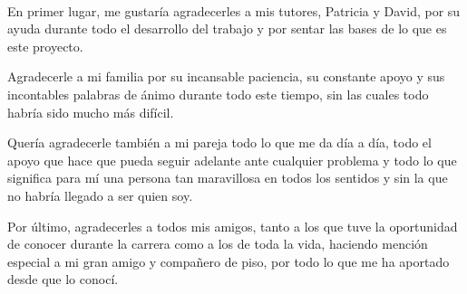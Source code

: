 \documentclass[11pt,a4paper,titlepage,oneside]{report}
\begin{document}
\setlength\arrayrulewidth{0.7pt}



\paxinaenbranco\
\begin{agradecementos}
  En primer lugar, me gustaría agradecerles a mis tutores, Patricia y David, por su ayuda durante todo el desarrollo del trabajo y por sentar
  las bases de lo que es este proyecto.

  Agradecerle a mi familia por su incansable paciencia, su constante apoyo y sus incontables
  palabras de ánimo durante todo este tiempo, sin las cuales todo habría sido mucho más difícil.

  Quería agradecerle también a mi pareja todo lo que me da día a día, todo el apoyo que hace que pueda
  seguir adelante ante cualquier problema y todo lo que significa para mí una persona tan maravillosa
  en todos los sentidos y sin la que no habría llegado a ser quien soy.

  Por último, agradecerles a todos mis amigos, tanto a los que tuve la oportunidad de conocer durante
  la carrera como a los de toda la vida, haciendo mención especial a mi gran amigo y compañero de
  piso, por todo lo que me ha aportado desde que lo conocí.
\end{agradecementos}


\setcounter{page}{1}

\tableofcontents
\listoffigures
\listoftables
\clearpage

\setcounter{page}{1}














\appendix



\clearpage
\end{document}
